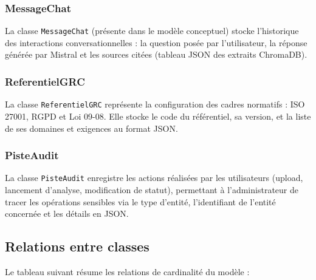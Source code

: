 \subsubsection*{MessageChat}

La classe \texttt{MessageChat} (présente dans le modèle conceptuel) stocke
l'historique des interactions conversationnelles : la question posée par
l'utilisateur, la réponse générée par Mistral et les sources citées
(tableau JSON des extraits ChromaDB).

\subsubsection*{ReferentielGRC}

La classe \texttt{ReferentielGRC} représente la configuration des cadres
normatifs : ISO 27001, RGPD et Loi 09-08. Elle stocke le code du
référentiel, sa version, et la liste de ses domaines et exigences au
format JSON.

\subsubsection*{PisteAudit}

La classe \texttt{PisteAudit} enregistre les actions réalisées par les
utilisateurs (upload, lancement d'analyse, modification de statut),
permettant à l'administrateur de tracer les opérations sensibles via le
type d'entité, l'identifiant de l'entité concernée et les détails en JSON.

\subsection{Relations entre classes}

Le tableau suivant résume les relations de cardinalité du modèle :

